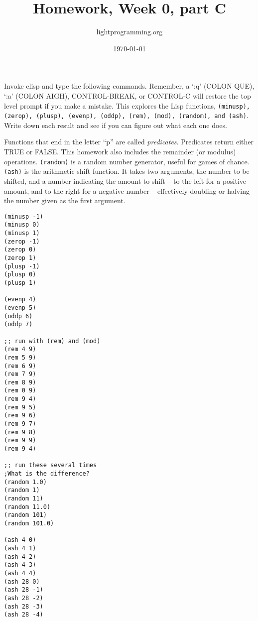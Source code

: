 \documentclass{article}
\title{Homework, Week 0, part C}
\author{lightprogramming.org}
\date{\today}
\begin{document}
\maketitle{}
\lstset{language=Lisp}

Invoke clisp and type the following commands. Remember, a `:q' (COLON QUE), `:a' (COLON AIGH), CONTROL-BREAK, or CONTROL-C will restore the top level prompt if you make a mistake. This explores the Lisp functions, \texttt{(minusp), (zerop), (plusp), (evenp), (oddp), (rem), (mod), (random), and (ash)}. Write down each result and see if you can figure out what each one does.

Functions that end in the letter ``p'' are called \textit{predicates}. Predicates return either TRUE or FALSE. This homework also includes the remainder (or modulus) operations. \texttt{(random)} is a random number generator, useful for games of chance. \texttt{(ash)} is the arithmetic shift function. It takes two arguments, the number to be shifted, and a number indicating the amount to shift -- to the left for a positive amount, and to the right for a negative number -- effectively doubling or halving the number given as the first argument.

\begin{multicols}{2}
\begin{lstlisting}
(minusp -1)
(minusp 0)
(minusp 1)
(zerop -1)
(zerop 0)
(zerop 1)
(plusp -1)
(plusp 0)
(plusp 1)

(evenp 4)
(evenp 5)
(oddp 6)
(oddp 7)

;; run with (rem) and (mod)
(rem 4 9)
(rem 5 9)
(rem 6 9)
(rem 7 9)
(rem 8 9)
(rem 0 9)
(rem 9 4)
(rem 9 5)
(rem 9 6)
(rem 9 7)
(rem 9 8)
(rem 9 9)
(rem 9 4)

;; run these several times
;What is the difference?
(random 1.0)
(random 1)
(random 11)
(random 11.0)
(random 101)
(random 101.0)

(ash 4 0)
(ash 4 1)
(ash 4 2)
(ash 4 3)
(ash 4 4)
(ash 28 0)
(ash 28 -1)
(ash 28 -2)
(ash 28 -3)
(ash 28 -4)
\end{lstlisting}
\end{multicols}
\end{document}
